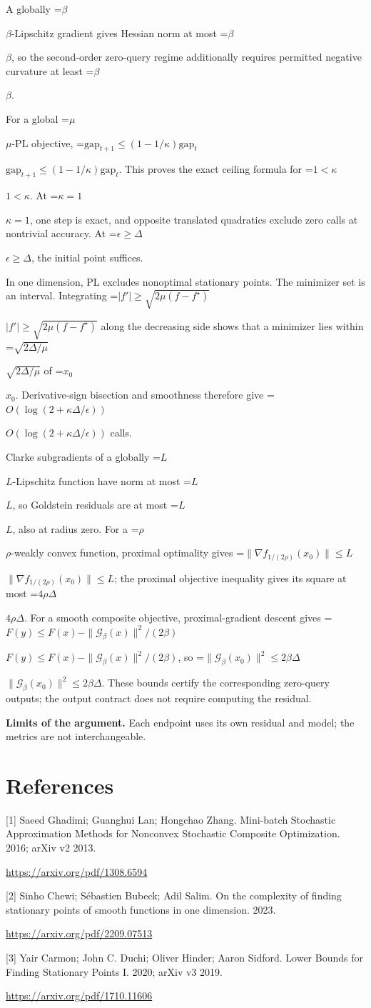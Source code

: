 \documentclass[10pt,a4paper]{article}
\newcommand{\AtlasMath}[1]{\par\begingroup\centering\setbox0=\hbox{$\displaystyle #1$}\ifdim\wd0>1.4\linewidth\typeout{ATLAS WIDE FORMULA: \the\wd0}\fi\ifdim\wd0>\linewidth\resizebox{\linewidth}{!}{\box0}\else\box0\fi\par\endgroup}
\newcommand{\AtlasInlineMath}[1]{\begingroup\setbox0=\hbox{$#1$}\ifdim\wd0>.4\linewidth\endgroup\AtlasMath{#1}\else\endgroup$#1$\fi}
\begin{document}
A globally \AtlasInlineMath{\beta}-Lipschitz gradient gives Hessian norm at most \AtlasInlineMath{\beta}, so the second-order zero-query regime additionally requires permitted negative curvature at least \AtlasInlineMath{\beta}.

For a global \AtlasInlineMath{\mu}-PL objective,
\AtlasInlineMath{\mathrm{gap}_{t+1}\le(1-1/\kappa)\mathrm{gap}_t}.
This proves the exact ceiling formula for \AtlasInlineMath{1<\kappa}. At \AtlasInlineMath{\kappa=1}, one step is exact, and opposite translated quadratics exclude zero calls at nontrivial accuracy. At \AtlasInlineMath{\epsilon\ge\Delta}, the initial point suffices.

In one dimension, PL excludes nonoptimal stationary points. The minimizer set is an interval. Integrating
\AtlasInlineMath{|f'|\ge\sqrt{2\mu(f-f^\star)}}
along the decreasing side shows that a minimizer lies within \AtlasInlineMath{\sqrt{2\Delta/\mu}} of \AtlasInlineMath{x_0}. Derivative-sign bisection and smoothness therefore give \AtlasInlineMath{O(\log(2+\kappa\Delta/\epsilon))} calls.

Clarke subgradients of a globally \AtlasInlineMath{L}-Lipschitz function have norm at most \AtlasInlineMath{L}, so Goldstein residuals are at most \AtlasInlineMath{L}, also at radius zero. For a \AtlasInlineMath{\rho}-weakly convex function, proximal optimality gives
\AtlasInlineMath{\|\nabla f_{1/(2\rho)}(x_0)\|\le L}; the proximal objective inequality gives its square at most \AtlasInlineMath{4\rho\Delta}.
For a smooth composite objective, proximal-gradient descent gives
\AtlasInlineMath{F(y)\le F(x)-\|\mathcal G_\beta(x)\|^2/(2\beta)},
so \AtlasInlineMath{\|\mathcal G_\beta(x_0)\|^2\le2\beta\Delta}.
These bounds certify the corresponding zero-query outputs; the output contract does not require computing the residual.

\textbf{Limits of the argument.} Each endpoint uses its own residual and model; the metrics are not interchangeable.

\section{References}
[1] Saeed Ghadimi; Guanghui Lan; Hongchao Zhang. Mini-batch Stochastic Approximation Methods for Nonconvex Stochastic Composite Optimization. 2016; arXiv v2 2013.

\url{https://arxiv.org/pdf/1308.6594}

[2] Sinho Chewi; Sébastien Bubeck; Adil Salim. On the complexity of finding stationary points of smooth functions in one dimension. 2023.

\url{https://arxiv.org/pdf/2209.07513}

[3] Yair Carmon; John C. Duchi; Oliver Hinder; Aaron Sidford. Lower Bounds for Finding Stationary Points I. 2020; arXiv v3 2019.

\url{https://arxiv.org/pdf/1710.11606}
\end{document}
